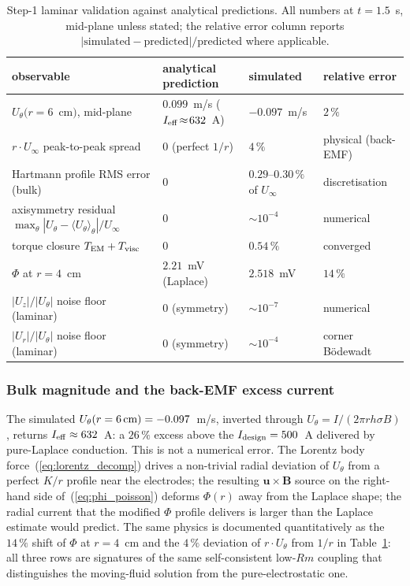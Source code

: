 \documentclass[aps,prl,twocolumn,superscriptaddress]{revtex4-2}
\begin{document}
\begin{table}[h!]
\centering
\caption{Step-1 laminar validation against analytical predictions.
All numbers at $t = 1.5$~s, mid-plane unless stated; the relative
error column reports
$|\text{simulated}-\text{predicted}|/\text{predicted}$ where
applicable.}
\label{tab:step1_validation}
\begin{tabular}{|l|l|l|l|}\hline
observable & analytical prediction & simulated & relative error \\ \hline
$U_\theta(r=6$~cm$)$, mid-plane &
$0.099$~m/s ($I_{\rm eff}\!\approx\!632$~A) & $-0.097$~m/s & $2\,\%$ \\
$r\!\cdot\!U_\infty$ peak-to-peak spread & $0$ (perfect $1/r$) & $4\,\%$ &
physical (back-EMF) \\
Hartmann profile RMS error (bulk) & $0$ &
$0.29$--$0.30\,\%$ of $U_\infty$ & discretisation \\
axisymmetry residual
$\max_\theta|U_\theta-\langle U_\theta\rangle_\theta|/U_\infty$ &
$0$ & $\sim\!10^{-4}$ & numerical \\
torque closure $T_{\rm EM}+T_{\rm visc}$ & $0$ & $0.54\,\%$ & converged \\
$\Phi$ at $r = 4$~cm & $2.21$~mV (Laplace) & $2.518$~mV & $14\,\%$ \\
$|U_z|/|U_\theta|$ noise floor (laminar) & $0$ (symmetry) & $\sim 10^{-7}$ &
numerical \\
$|U_r|/|U_\theta|$ noise floor (laminar) & $0$ (symmetry) & $\sim 10^{-4}$ &
corner B\"odewadt \\ \hline
\end{tabular}
\end{table}

\subsubsection*{Bulk magnitude and the back-EMF excess current}
The simulated $U_\theta(r=6\,\rm cm) = -0.097$~m/s, inverted through
$U_\theta = I/(2\pi r h \sigma B)$, returns
$I_{\rm eff} \approx 632$~A: a $26\,\%$ excess above the
$I_{\rm design} = 500$~A delivered by pure-Laplace conduction.  This
is not a numerical error.  The Lorentz body
force~(\ref{eq:lorentz_decomp}) drives a non-trivial radial deviation
of $U_\theta$ from a perfect $K/r$ profile near the electrodes; the
resulting $\mathbf{u}\!\times\!\mathbf{B}$ source on the right-hand
side of~(\ref{eq:phi_poisson}) deforms $\Phi(r)$ away from the
Laplace shape; the radial current that the modified $\Phi$ profile
delivers is larger than the Laplace estimate would predict.  The same
physics is documented quantitatively as the $14\,\%$ shift of $\Phi$
at $r = 4$~cm and the $4\,\%$ deviation of $r\!\cdot\!U_\theta$ from
$1/r$ in Table~\ref{tab:step1_validation}: all three rows are
signatures of the same self-consistent low-$Rm$ coupling that
distinguishes the moving-fluid solution from the pure-electrostatic
one.
\end{document}
